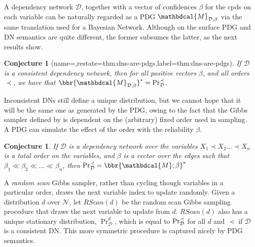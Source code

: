 \documentclass[letterpaper]{article} %
\theoremstyle{plain}
\newtheorem{lemma}[theorem]{Lemma}
\newtheorem{conj}[theorem]{Conjecture}
\theoremstyle{definition}
\theoremstyle{remark}
\newcommand{\begthm}[3][]{\begin{#2}[{name=#1},restate=#3,label=#3]}
\newcommand{\valpha}[1]{#1}
\newcommand\mat[1]{\mathbf{#1}}
\newcommand{\V}{\mathcal V}
\newcommand{\N}{\mathcal N}
\newcommand{\Ed}{\mathcal E}
\newcommand{\dg}[1]{\mathbdcal{#1}}
\newcommand{\IDef}[1]{\mathit{IDef}_{\!#1}}
\newcommand{\PDGof}[1]{{\dg M}_{#1}}
\begin{document}
{A dependency network $\mathcal D$, together with a vector of
confidences $\beta$ for the cpds on each variable 
can be naturally regarded as a PDG $\PDGof{\mathcal D, \beta}$ 
via the same translation used for a Bayesian Network.
Although on the surface PDG and DN semantics are quite
different,
the former subsumes the latter, as the next results show.




\begthm{conj}{thm:dns-are-pdgs}
If $\mathcal D$ is a consistent dependency network,
then for all positive vectors $\beta$, and all orders $\prec$, we have that
$\bbr{\PDGof{\mathcal D, \beta}}^* =  \Pr_{\cal D}^\prec$.
\end{conj}

Inconsistent DNs still define a unique distribution, but we cannot hope that it 
will be the same one as generated by the PDG, owing to the fact that
the Gibbs sampler defined by \citeauthor{heckerman2000dependency} is dependent
on the (arbitrary) fixed order used in sampling.
A PDG can simulate the effect of the order with the reliability $\beta$.

\begin{conj}
If $\mathcal D$ is a dependency network over the variables
$X_1 \prec X_2  \ldots  \prec X_n$ is a total order on the variables, and $\beta$ is a vector over the edges
such that  $\beta_1 \ll\beta_2 \ll \ldots \ll \beta_n$, 
then $\Pr_{\cal D}^{\prec} = \bbr{\dg M; \beta}^*$
\end{conj}

A \emph{random scan} Gibbs sampler, rather than cycling though variables in a 
particular order, draws the next variable index to update randomly.
Given a distribution $d$ over $\N$,
let $\mathit{RScan}(d)$ be the random scan Gibbs sampling procedure that draws
the next variable to update from $d$. $\mathit{RScan}(d)$ also has a
unique stationary distribution, $\Pr_{\mathcal D}^d$, which is equal
to $\Pr_{\cal D}^{\prec}$ for all $d$ and $\prec$ if $\mathcal D$ is a
consistent DN. This more symmetric procedure is captured nicely by PDG
semantics. 

}
\end{document}
